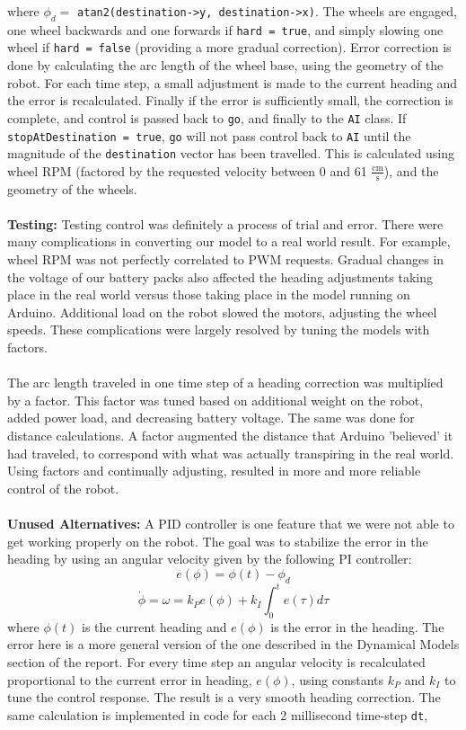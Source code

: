 \documentclass[paper=a4, fontsize=11pt]{scrartcl}
\numberwithin{equation}{section}		%
\numberwithin{figure}{section}			%
\numberwithin{table}{section}				%
\begin{document}
{where $\phi_d =$ \texttt{atan2(destination->y, destination->x)}. The wheels are engaged, one wheel backwards and one forwards if \texttt{hard = true}, and simply slowing one wheel if \texttt{hard = false} (providing a more gradual correction). Error correction is done by calculating the arc length of the wheel base, using the geometry of the robot. For each time step, a small adjustment is made to the current heading and the error is recalculated. Finally if the error is sufficiently small, the correction is complete, and control is passed back to \texttt{go}, and finally to the \texttt{AI} class. If \texttt{stopAtDestination = true}, \texttt{go} will not pass control back to \texttt{AI} until the magnitude of the \texttt{destination} vector has been travelled. This is calculated using wheel RPM (factored by the requested velocity between 0 and 61 $\frac{\text{cm}}{\text{s}}$), and the geometry of the wheels.
\\\\
\textbf{Testing: }
Testing control was definitely a process of trial and error. There were many complications in converting our model to a real world result. For example, wheel RPM was not perfectly correlated to PWM requests. Gradual changes in the voltage of our battery packs also affected the heading adjustments taking place in the real world versus those taking place in the model running on Arduino. Additional load on the robot slowed the motors, adjusting the wheel speeds. These complications were largely resolved by tuning the models with factors.
\\\\
The arc length traveled in one time step of a heading correction was multiplied by a factor. This factor was tuned based on additional weight on the robot, added power load, and decreasing battery voltage. The same was done for distance calculations. A factor augmented the distance that Arduino 'believed' it had traveled, to correspond with what was actually transpiring in the real world. Using factors and continually adjusting, resulted in more and more reliable control of the robot.
\\\\
\textbf{Unused Alternatives: }
A PID controller is one feature that we were not able to get working properly on the robot. The goal was to stabilize the error in the heading by using an angular velocity given by the following PI controller:
$$e(\phi) = \phi(t) - \phi_d$$
$$\dot\phi = \omega = k_Pe(\phi) + k_I\int_0^te(\tau)d\tau$$
where $\phi(t)$ is the current heading and $e(\phi)$ is the error in the heading. The error here is a more general version of the one described in the Dynamical Models section of the report. For every time step an angular velocity is recalculated proportional to the current error in heading, $e(\phi)$, using constants $k_P$ and $k_I$ to tune the control response. The result is a very smooth heading correction. The same calculation is implemented in code for each 2 millisecond time-step \texttt{dt},
}
\end{document}
